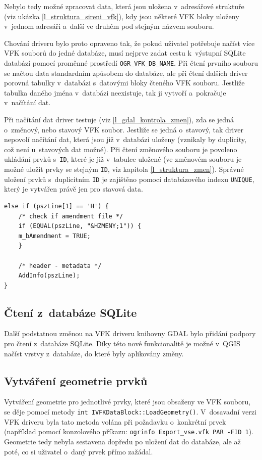 \documentclass[a4paper,12pt,oneside]{book}
\begin{document}
Nebylo tedy možné zpracovat data, která jsou uložena v~adresářové
struktuře (viz ukázka \ref{l_struktura_sireni_vfk}), kdy jsou některé
VFK bloky uloženy v~jednom adresáři a~další ve druhém pod stejným
názvem souboru.

Chování driveru bylo proto opraveno tak, že pokud uživatel potřebuje
načíst více VFK souborů do jedné databáze, musí nejprve zadat cestu
k~výstupní SQLite databází pomocí proměnné prostředí
\texttt{OGR\_VFK\_DB\_NAME}. Při čtení prvního souboru se načtou data
standardním způsobem do databáze, ale při čtení dalších driver porovná
tabulky v~databázi s~datovými bloky čteného VFK souboru. Jestliže
tabulka daného jména v~databázi neexistuje, tak ji vytvoří a~pokračuje
v~načítání dat.

Při načítání dat driver testuje (viz \ref{l_gdal_kontrola_zmen}), zda
se jedná o~změnový, nebo stavový VFK soubor. Jestliže se jedná
o~stavový, tak driver nepovolí načítání dat, která jsou již v~databázi
uloženy (vznikaly by duplicity, což není u~stavových dat možné). Při
čtení změnového souboru je povoleno ukládání prvků s~\texttt{ID},
které je již v~tabulce uložené (ve změnovém souboru je možné uložit
prvky se stejným \texttt{ID}, viz kapitola
\ref{l_struktura_zmen}). Správné uložení prvků s~duplicitním
\texttt{ID} je zajištěno pomocí databázového indexu \texttt{UNIQUE},
který je vytvářen právě jen pro stavová data.

\begin{lstlisting}[style=c++, 
		    caption={Výňatek z~kódu pro kontrolu změnového souboru}, 
		    label=l_gdal_kontrola_zmen]
else if (pszLine[1] == 'H') {
    /* check if amendment file */
    if (EQUAL(pszLine, "&HZMENY;1")) {
	m_bAmendment = TRUE;
    }

    /* header - metadata */
    AddInfo(pszLine);
}
\end{lstlisting}

\subsection{Čtení z~databáze SQLite}
Další podstatnou změnou na VFK driveru knihovny GDAL bylo přidání
podpory pro čtení z~databáze SQLite. Díky této nové funkcionalitě je
možné v~QGIS načíst vrstvy z~databáze, do které byly aplikovány změny.

\subsection{Vytváření geometrie prvků}
Vytváření geometrie pro jednotlivé prvky, které jsou obsaženy ve VFK
souboru, se děje pomocí metody \texttt{int
  IVFKDataBlock::LoadGeometry()}. V~dosavadní verzi VFK driveru byla
tato metoda volána při požadavku o~konkrétní prvek (například pomocí
konzolového příkazu: \texttt{ogrinfo Export\_vse.vfk PAR -FID
  1}). Geometrie tedy nebyla sestavena dopředu po uložení dat do
databáze, ale až poté, co si uživatel o~daný prvek přímo zažádal.
\end{document}
